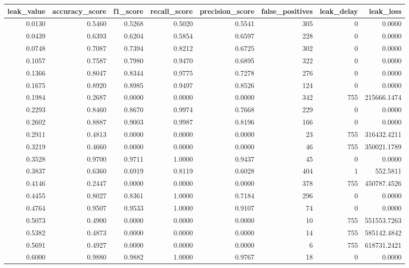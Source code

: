 \begin{tabular}{rrrrrrrr}
\toprule
leak\_value & accuracy\_score & f1\_score & recall\_score & precision\_score & false\_positives & leak\_delay & leak\_loss \\
\midrule
0.0130 & 0.5460 & 0.5268 & 0.5020 & 0.5541 & 305 & 0 & 0.0000 \\
0.0439 & 0.6393 & 0.6204 & 0.5854 & 0.6597 & 228 & 0 & 0.0000 \\
0.0748 & 0.7087 & 0.7394 & 0.8212 & 0.6725 & 302 & 0 & 0.0000 \\
0.1057 & 0.7587 & 0.7980 & 0.9470 & 0.6895 & 322 & 0 & 0.0000 \\
0.1366 & 0.8047 & 0.8344 & 0.9775 & 0.7278 & 276 & 0 & 0.0000 \\
0.1675 & 0.8920 & 0.8985 & 0.9497 & 0.8526 & 124 & 0 & 0.0000 \\
0.1984 & 0.2687 & 0.0000 & 0.0000 & 0.0000 & 342 & 755 & 215666.1474 \\
0.2293 & 0.8460 & 0.8670 & 0.9974 & 0.7668 & 229 & 0 & 0.0000 \\
0.2602 & 0.8887 & 0.9003 & 0.9987 & 0.8196 & 166 & 0 & 0.0000 \\
0.2911 & 0.4813 & 0.0000 & 0.0000 & 0.0000 & 23 & 755 & 316432.4211 \\
0.3219 & 0.4660 & 0.0000 & 0.0000 & 0.0000 & 46 & 755 & 350021.1789 \\
0.3528 & 0.9700 & 0.9711 & 1.0000 & 0.9437 & 45 & 0 & 0.0000 \\
0.3837 & 0.6360 & 0.6919 & 0.8119 & 0.6028 & 404 & 1 & 552.5811 \\
0.4146 & 0.2447 & 0.0000 & 0.0000 & 0.0000 & 378 & 755 & 450787.4526 \\
0.4455 & 0.8027 & 0.8361 & 1.0000 & 0.7184 & 296 & 0 & 0.0000 \\
0.4764 & 0.9507 & 0.9533 & 1.0000 & 0.9107 & 74 & 0 & 0.0000 \\
0.5073 & 0.4900 & 0.0000 & 0.0000 & 0.0000 & 10 & 755 & 551553.7263 \\
0.5382 & 0.4873 & 0.0000 & 0.0000 & 0.0000 & 14 & 755 & 585142.4842 \\
0.5691 & 0.4927 & 0.0000 & 0.0000 & 0.0000 & 6 & 755 & 618731.2421 \\
0.6000 & 0.9880 & 0.9882 & 1.0000 & 0.9767 & 18 & 0 & 0.0000 \\
\bottomrule
\end{tabular}
